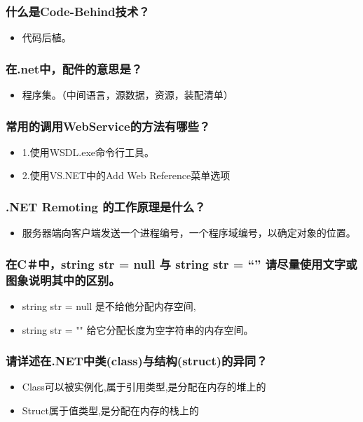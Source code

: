 \documentclass[9pt, b5paper]{article}
\begin{document}
\subsubsection{什么是Code-Behind技术？}
\label{sec-1-1-21}
\begin{itemize}
\item 代码后植。
\end{itemize}
\subsubsection{在.net中，配件的意思是？}
\label{sec-1-1-22}
\begin{itemize}
\item 程序集。（中间语言，源数据，资源，装配清单）
\end{itemize}
\subsubsection{常用的调用WebService的方法有哪些？}
\label{sec-1-1-23}
\begin{itemize}
\item 1.使用WSDL.exe命令行工具。
\item 2.使用VS.NET中的Add Web Reference菜单选项
\end{itemize}
\subsubsection{.NET Remoting 的工作原理是什么？}
\label{sec-1-1-24}
\begin{itemize}
\item 服务器端向客户端发送一个进程编号，一个程序域编号，以确定对象的位置。
\end{itemize}
\subsubsection{在C＃中，string str = null 与 string str = “” 请尽量使用文字或图象说明其中的区别。}
\label{sec-1-1-25}
\begin{itemize}
\item string str = null 是不给他分配内存空间,
\item string str = "" 给它分配长度为空字符串的内存空间。
\end{itemize}
\subsubsection{请详述在.NET中类(class)与结构(struct)的异同？}
\label{sec-1-1-26}
\begin{itemize}
\item Class可以被实例化,属于引用类型,是分配在内存的堆上的
\item Struct属于值类型,是分配在内存的栈上的
\end{itemize}
\end{document}
